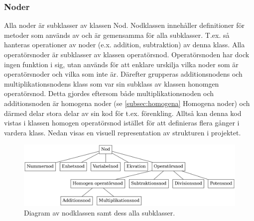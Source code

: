 \documentclass[12pt,a4paper]{article}
\begin{document}
\subsubsection{Noder}
Alla noder är subklasser av klassen Nod. Nodklassen innehåller definitioner för metoder som används av och är gemensamma för alla subklasser. T.ex. så hanteras operationer av noder (e.x. addition, subtraktion) av denna klass. Alla operatörsnoder är subklasser av klassen operatörsnod. Operatörsnoden har dock ingen funktion i sig, utan används för att enklare urskilja vilka noder som är operatörsnoder och vilka som inte är. Därefter grupperas additionsnodens och multiplikationsnodens klass som var sin subklass av klassen honomgen operatörsnod. Detta gjordes eftersom både multiplikationsnoden och additionsnoden är homogena noder (se \ref{subsec:homogena} Homogena noder) och därmed delar stora delar av sin kod för t.ex. förenkling. Alltså kan denna kod vistas i klassen homogen operatörsnod istället för att definieras flera gånger i vardera klass. Nedan visas en visuell representation av strukturen i projektet.
\begin{figure}[h!]
  \center
  \includegraphics[width=1\textwidth]{image20}
  \caption{Diagram av nodklassen samt dess alla subklasser.}
\end{figure}
\end{document}
